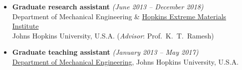 \documentclass[a4paper,10pt, oneside]{article}
\begin{document}
\begin{itemize}[wide, labelwidth=!, labelindent=-1em]

		\vspace*{0.5em}
		\item[]\textbf{Graduate research assistant} \hfill \textit{(June 2013 -- December 2018)}\\
		Department of Mechanical Engineering \& \href{https://hemi.jhu.edu/}{Hopkins Extreme Materials Institute}\\
		Johns Hopkins University, U.S.A. (\textit{Advisor}: Prof.~K.~T.~Ramesh) 

		\vspace*{0.5em}
		\item[]\textbf{Graduate teaching assistant} \hfill \textit{(January 2013  -- May 2017)} \\
		\href{https://me.jhu.edu/}{Department of Mechanical Engineering}, Johns Hopkins University, U.S.A.
	\end{itemize}
	
\end{document}
